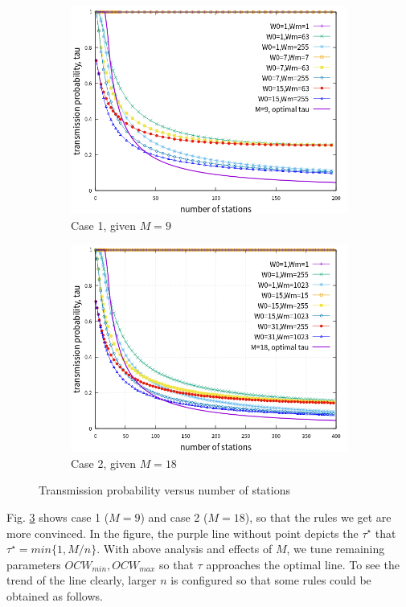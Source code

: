 \documentclass[journal]{IEEEtran}
\begin{document}
\begin{figure}[!h]
\centering
\begin{subfigure}{0.5\textwidth}
\includegraphics[scale=.54]{./figure/chp4/M9/n_tau_perf_M9_x200.png}
\caption{Case 1, given $M=9$}
\label{fig_tau_n_M9}
\end{subfigure}
\begin{subfigure}{0.5\textwidth}
\includegraphics[scale=.54]{./figure/chp4/M18/n_tau_perf_M18_x400.png}
\caption{Case 2, given $M=18$}
\label{fig_tau_n_M18}
\end{subfigure}
\caption{Transmission probability versus number of stations}
\label{fig_tau_n}
\end{figure}
Fig. \ref{fig_tau_n} shows case 1 ($M=9$) and case 2 ($M=18$), so that the rules we get are more convinced.
In the figure, the purple line without point depicts the $\tau^\star$ that $\tau^\star = min\lbrace 1, M/n \rbrace$.
With above analysis and effects of $M$, we tune remaining parameters $OCW_{min}, OCW_{max}$ so that $\tau$ approaches the optimal line. 
To see the trend of the line clearly, larger $n$ is configured so that some rules could be obtained as follows.
\end{document}
